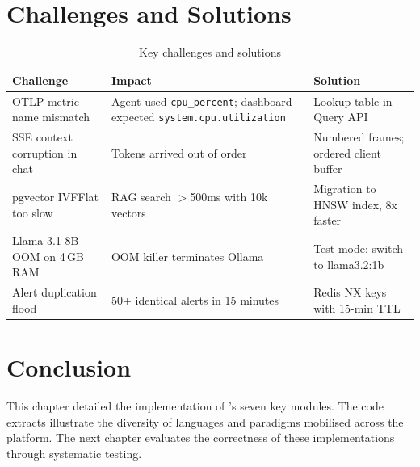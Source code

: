\section{Challenges and Solutions}

\begin{table}[H]
\centering
\caption{Key challenges and solutions}
\label{tab:challenges}
\small
\begin{tabularx}{\textwidth}{lXX}
\toprule
\textbf{Challenge} & \textbf{Impact} & \textbf{Solution} \\
\midrule
OTLP metric name mismatch
  & Agent used \texttt{cpu\_percent}; dashboard expected \texttt{system.cpu.utilization}
  & Lookup table in Query API \\
SSE context corruption in chat
  & Tokens arrived out of order
  & Numbered frames; ordered client buffer \\
pgvector IVFFlat too slow
  & RAG search $>$500ms with 10k vectors
  & Migration to HNSW index, 8x faster \\
Llama 3.1 8B OOM on 4\,GB RAM
  & OOM killer terminates Ollama
  & Test mode: switch to llama3.2:1b \\
Alert duplication flood
  & 50+ identical alerts in 15 minutes
  & Redis NX keys with 15-min TTL \\
\bottomrule
\end{tabularx}
\end{table}

\section*{Conclusion}

This chapter detailed the implementation of \caimp{}'s seven key modules.
The code extracts illustrate the diversity of languages and paradigms mobilised
across the platform. The next chapter evaluates the correctness of these
implementations through systematic testing.
